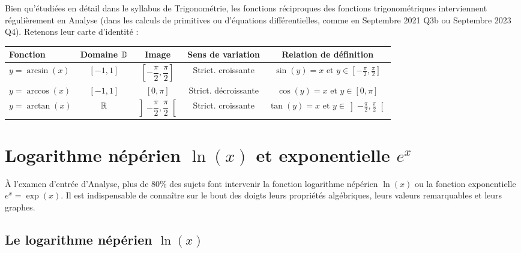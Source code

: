 Bien qu'étudiées en détail dans le syllabus de Trigonométrie, les fonctions réciproques des fonctions trigonométriques interviennent régulièrement en Analyse (dans les calculs de primitives ou d'équations différentielles, comme en Septembre 2021 Q3b ou Septembre 2023 Q4). Retenons leur carte d'identité :

\begin{center}
{\small
\renewcommand{\arraystretch}{1.45}
\setlength{\tabcolsep}{4.5pt}
\begin{tabular}{@{}lcccc@{}}
\toprule
\textbf{Fonction} & \textbf{Domaine $\mathbb{D}$} & \textbf{Image} & \textbf{Sens de variation} & \textbf{Relation de définition} \\
\midrule
$y = \arcsin(x)$ & $[-1, 1]$ & $\left[-\dfrac{\pi}{2}, \dfrac{\pi}{2}\right]$ & Strict. croissante & $\sin(y) = x \text{ et } y \in \left[-\frac{\pi}{2}, \frac{\pi}{2}\right]$ \\
$y = \arccos(x)$ & $[-1, 1]$ & $[0, \pi]$ & Strict. décroissante & $\cos(y) = x \text{ et } y \in [0, \pi]$ \\
$y = \arctan(x)$ & $\mathbb{R}$ & $\left]-\dfrac{\pi}{2}, \dfrac{\pi}{2}\right[$ & Strict. croissante & $\tan(y) = x \text{ et } y \in \left]-\frac{\pi}{2}, \frac{\pi}{2}\right[$ \\
\bottomrule
\end{tabular}
}
\end{center}

\section{Logarithme népérien $\ln(x)$ et exponentielle $e^x$}

À l'examen d'entrée d'Analyse, plus de 80\% des sujets font intervenir la fonction logarithme népérien $\ln(x)$ ou la fonction exponentielle $e^x = \exp(x)$. Il est indispensable de connaître sur le bout des doigts leurs propriétés algébriques, leurs valeurs remarquables et leurs graphes.

\subsection{Le logarithme népérien $\ln(x)$}

